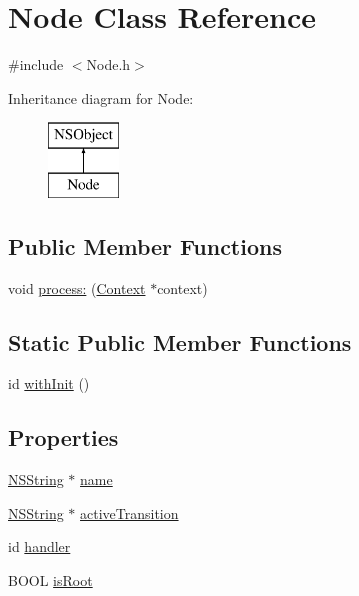 \hypertarget{interface_node}{
\section{\-Node \-Class \-Reference}
\label{interface_node}
}


{\ttfamily \#include $<$\-Node.\-h$>$}

\-Inheritance diagram for \-Node\-:\begin{figure}[H]
\begin{center}
\leavevmode
\includegraphics[height=2.000000cm]{interface_node}
\end{center}
\end{figure}
\subsection*{\-Public \-Member \-Functions}
\begin{DoxyCompactItemize}
\item 
void \hyperlink{interface_node_a0088fa63b54fb309c104ec0ebcbf143c}{process\-:} (\hyperlink{interface_context}{\-Context} $\ast$context)
\end{DoxyCompactItemize}
\subsection*{\-Static \-Public \-Member \-Functions}
\begin{DoxyCompactItemize}
\item 
id \hyperlink{interface_node_a97b6612d836a6a9298b09d83c7425e7d}{with\-Init} ()
\end{DoxyCompactItemize}
\subsection*{\-Properties}
\begin{DoxyCompactItemize}
\item 
\hyperlink{class_n_s_string}{\-N\-S\-String} $\ast$ \hyperlink{interface_node_aad6e01bce03adb9160d78b85009888db}{name}
\item 
\hyperlink{class_n_s_string}{\-N\-S\-String} $\ast$ \hyperlink{interface_node_a4df1a0e35dd5590c29156a653b809da7}{active\-Transition}
\item 
id \hyperlink{interface_node_ab23f37e56c98ce84725ebc133098bae5}{handler}
\item 
\-B\-O\-O\-L \hyperlink{interface_node_a6a5bd06c318b95452727f5a354e7eb60}{is\-Root}
\end{DoxyCompactItemize}


